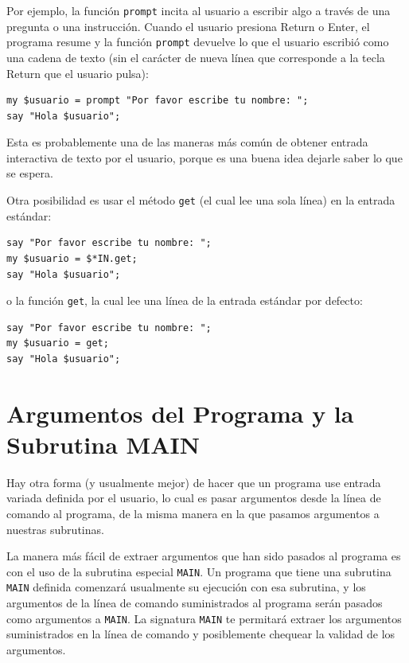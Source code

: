 Por ejemplo, la función {\tt prompt} incita al usuario a escribir
algo a través de una pregunta o una instrucción. Cuando el usuario 
presiona {\sf Return} o {\sf Enter}, el programa resume y 
la función \verb|prompt| devuelve lo que el usuario escribió 
como una cadena de texto (sin el carácter de nueva línea que 
corresponde a la tecla {\sf Return} que el usuario pulsa):

\begin{lstlisting}
my $usuario = prompt "Por favor escribe tu nombre: ";
say "Hola $usuario";
\end{lstlisting}
%

Esta es probablemente una de las maneras más común de
obtener entrada interactiva de texto por el usuario, porque
es una buena idea dejarle saber lo que se espera.

Otra posibilidad es usar el método {\tt get} (el cual lee
una sola línea) en la entrada estándar:

\begin{lstlisting}
say "Por favor escribe tu nombre: ";
my $usuario = $*IN.get;
say "Hola $usuario";
\end{lstlisting}
%
o la función {\tt get}, la cual lee una línea de la entrada
estándar por defecto:
\begin{lstlisting}
say "Por favor escribe tu nombre: ";
my $usuario = get;
say "Hola $usuario";
\end{lstlisting}
%

\section{Argumentos del Programa y la Subrutina MAIN}
\label{MAIN}

Hay otra forma (y usualmente mejor) de hacer que un programa
use entrada variada definida por el usuario, lo cual es 
pasar argumentos desde la línea de comando al programa, de 
la misma manera en la que pasamos argumentos a nuestras subrutinas.

La manera más fácil de extraer argumentos que han sido pasados
al programa es con el uso de la subrutina especial \verb|MAIN|.
Un programa que tiene una subrutina \verb|MAIN| definida
comenzará usualmente su ejecución con esa subrutina, y los argumentos
de la línea de comando suministrados al programa serán pasados
como argumentos a \verb|MAIN|. La signatura \verb|MAIN| te 
permitará extraer los argumentos suministrados en la línea de comando
y posiblemente chequear la validad de los argumentos. 

